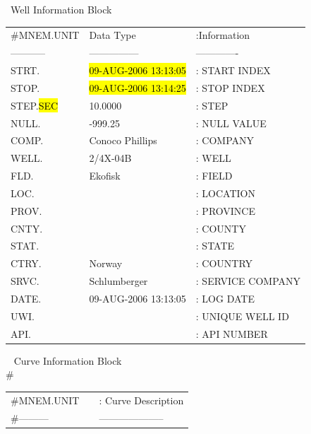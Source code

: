 \documentclass[12pt,a4paper,oneside]{report}
\begin{document}
\begin{appendices}
\begin{mdframed}[backgroundcolor=gray!10]
~Well Information Block
\begin{table}[H]
\begin{tabu} to 1\textwidth {X[l] X[2,r] X[2,l]}
$\#$MNEM.UNIT&                   Data Type& :Information\\
----------- & ---------------&-------------\\
  STRT.\hl{\:\:\:\:\:}     & \hl{09-AUG-2006 13:13:05} &: START INDEX     	\\              
  STOP.\hl{\:\:\:\:\:}     & \hl{09-AUG-2006 13:14:25} &: STOP INDEX       	\\            
  STEP.\hl{SEC}       &    10.0000 &: STEP                   	\\       
  NULL.          &    -999.25 &: NULL VALUE              	\\      
  COMP.    & Conoco Phillips  &: COMPANY               		\\        
  WELL.    &        2/4X-04B  &: WELL                    	\\      
   FLD.    &         Ekofisk  &: FIELD                  	\\       
   LOC.    &                  &: LOCATION                	\\      
  PROV.    &                  &: PROVINCE                 	\\     
  CNTY.    &                  &: COUNTY                   	\\     
  STAT.    &                  &: STATE                     	\\    
  CTRY.    &          Norway  &: COUNTRY                  	\\     
  SRVC.    &    Schlumberger  &: SERVICE COMPANY          	\\     
  DATE.    &       09-AUG-2006 13:13:05 &: LOG DATE        	\\              
   UWI.    &                  &: UNIQUE WELL ID            	\\    
   API.    &                  &: API NUMBER  	
\end{tabu}
\end{table}
\noindent ~ Curve Information Block \\
$\#$
\begin{table}[H]
\begin{tabu} to 1\textwidth {X[l] X[2,l] X[2,l]}   
$\#$MNEM.UNIT &                    &: Curve Description 	\\
$\#$--------- &                    & --------------------	\\

\end{tabu}
\end{table}
\end{mdframed}
\end{appendices}
\end{document}
